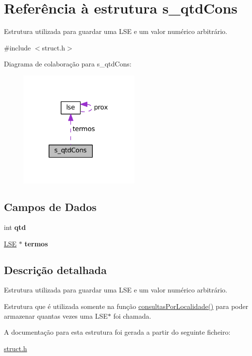 \hypertarget{structs__qtd_cons}{}\section{Referência à estrutura s\+\_\+qtd\+Cons}
\label{structs__qtd_cons}


Estrutura utilizada para guardar uma L\+SE e um valor numérico arbitrário.  




{\ttfamily \#include $<$struct.\+h$>$}



Diagrama de colaboração para s\+\_\+qtd\+Cons\+:\nopagebreak
\begin{figure}[H]
\begin{center}
\leavevmode
\includegraphics[width=172pt]{structs__qtd_cons__coll__graph}
\end{center}
\end{figure}
\subsection*{Campos de Dados}
\begin{DoxyCompactItemize}
\item 
\mbox{\label{structs__qtd_cons_ab64e355d6f14927f41266ddfbf88ac91}} 
int {\bfseries qtd}
\item 
\mbox{\label{structs__qtd_cons_a455687e406c855e366193f3ba638ed6d}} 
\hyperlink{struct_8h_a0d3de75d86bf1db6f749c91f755b870c}{L\+SE} $\ast$ {\bfseries termos}
\end{DoxyCompactItemize}


\subsection{Descrição detalhada}
Estrutura utilizada para guardar uma L\+SE e um valor numérico arbitrário. 

Estrutura que é utilizada somente na função \hyperlink{operacoes_8h_a51685935591ec37d31c3a5600fe3f721}{consultas\+Por\+Localidade()} para poder armazenar quantas vezes uma {\ttfamily L\+S\+E$\ast$} foi chamada. 

A documentação para esta estrutura foi gerada a partir do seguinte ficheiro\+:\begin{DoxyCompactItemize}
\item 
\hyperlink{struct_8h}{struct.\+h}\end{DoxyCompactItemize}
